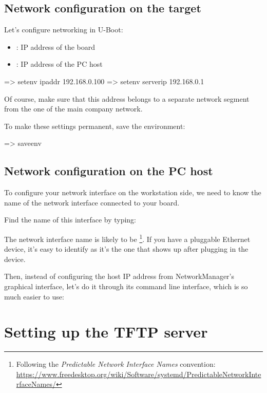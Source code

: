 \subsection{Network configuration on the target}

Let's configure networking in U-Boot:

\begin{itemize}
\item {}: IP address of the board
\item {}: IP address of the PC host
\end{itemize}

\begin{ubootinput}
=> setenv ipaddr 192.168.0.100
=> setenv serverip 192.168.0.1
\end{ubootinput}

Of course, make sure that this address belongs to a separate network
segment from the one of the main company network.

To make these settings permanent, save the environment:

\begin{ubootinput}
=> saveenv
\end{ubootinput}

\subsection{Network configuration on the PC host}

To configure your network interface on the workstation side, we need
to know the name of the network interface connected to your board.

Find the name of this interface by typing:

The network interface name is likely to be
\footnote{Following the {\em Predictable Network Interface
Names} convention:
\url{https://www.freedesktop.org/wiki/Software/systemd/PredictableNetworkInterfaceNames/}}.
If you have a pluggable Ethernet device, it's easy to identify as it's
the one that shows up after plugging in the device.

Then, instead of configuring the host IP address from NetworkManager's
graphical interface, let's do it through its command line interface,
which is so much easier to use:


\section{Setting up the TFTP server}

